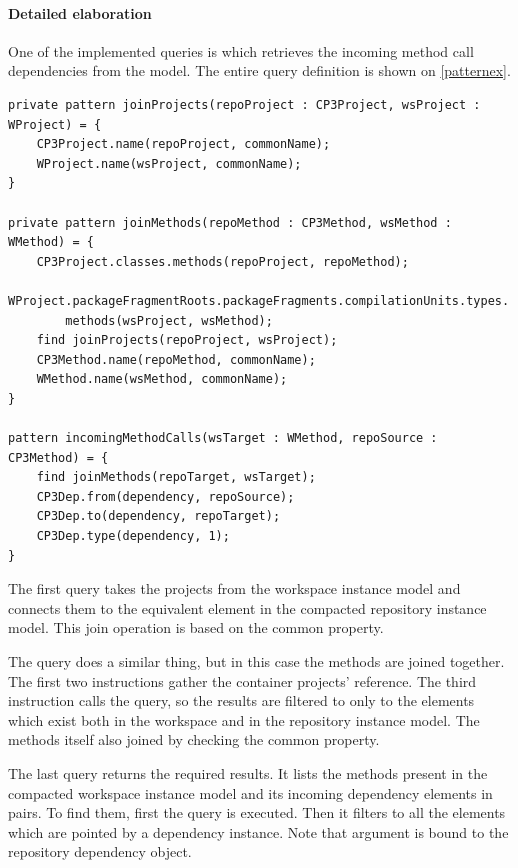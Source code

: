 \paragraph{Detailed elaboration}
One of the implemented queries is which retrieves the incoming method call 
dependencies from the model. The entire query definition is shown on \autoref{patternex}.
\begin{lstlisting}[caption=Elements of the incoming method call dependency query,label=patternex]
private pattern joinProjects(repoProject : CP3Project, wsProject : WProject) = {
	CP3Project.name(repoProject, commonName);
	WProject.name(wsProject, commonName);
}

private pattern joinMethods(repoMethod : CP3Method, wsMethod : WMethod) = {
	CP3Project.classes.methods(repoProject, repoMethod);
	WProject.packageFragmentRoots.packageFragments.compilationUnits.types.
		methods(wsProject, wsMethod);
	find joinProjects(repoProject, wsProject);
	CP3Method.name(repoMethod, commonName);
	WMethod.name(wsMethod, commonName);
}

pattern incomingMethodCalls(wsTarget : WMethod, repoSource : CP3Method) = {
	find joinMethods(repoTarget, wsTarget);
	CP3Dep.from(dependency, repoSource);
	CP3Dep.to(dependency, repoTarget);
	CP3Dep.type(dependency, 1);
}
\end{lstlisting}

The first  query takes the projects from the workspace
instance model and connects them to the equivalent element in the compacted
repository instance model. This join operation is based on the common 
property.

The  query does a similar thing, but in this case the methods
are joined together. The first two instructions gather the container projects'
reference. The third instruction calls the  query, so the 
results are filtered to only to the elements which exist both in the workspace
and in the repository instance model. The methods itself also joined by 
checking the common  property.

The last  query returns the required results. It lists
the methods present in the compacted workspace instance model and its incoming
dependency elements in pairs. To find them, first the  query
is executed. Then it filters to all the elements which are pointed by a
dependency instance. Note that  argument is bound to the
repository dependency object.


